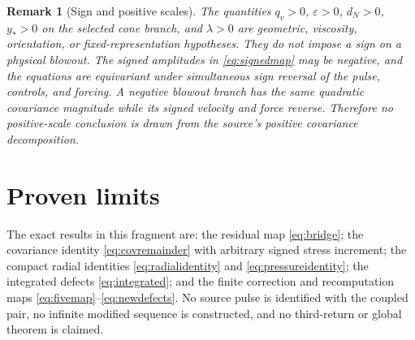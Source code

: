 \documentclass[11pt]{article}
\newtheorem{remark}{Remark}
\begin{document}
\begin{remark}[Sign and positive scales]
The quantities $q_v>0$, $\varepsilon>0$, $d_N>0$, $y_*>0$ on the selected cone branch, and
$\lambda>0$ are geometric, viscosity, orientation, or fixed-representation hypotheses.
They do not impose a sign on a physical blowout.  The signed amplitudes in
\eqref{eq:signedmap} may be negative, and the equations are equivariant under simultaneous
sign reversal of the pulse, controls, and forcing.  A negative blowout branch has the same
quadratic covariance magnitude while its signed velocity and force reverse.  Therefore no
positive-scale conclusion is drawn from the source's positive covariance decomposition.
\end{remark}

\section{Proven limits}
The exact results in this fragment are: the residual map \eqref{eq:bridge}; the covariance
identity \eqref{eq:covremainder} with arbitrary signed stress increment; the compact radial
identities \eqref{eq:radialidentity} and \eqref{eq:pressureidentity}; the integrated defects
\eqref{eq:integrated}; and the finite correction and recomputation maps
\eqref{eq:fivemap}--\eqref{eq:newdefects}.  No source pulse is identified with the coupled
pair, no infinite modified sequence is constructed, and no third-return or global theorem is
claimed.
\end{document}
